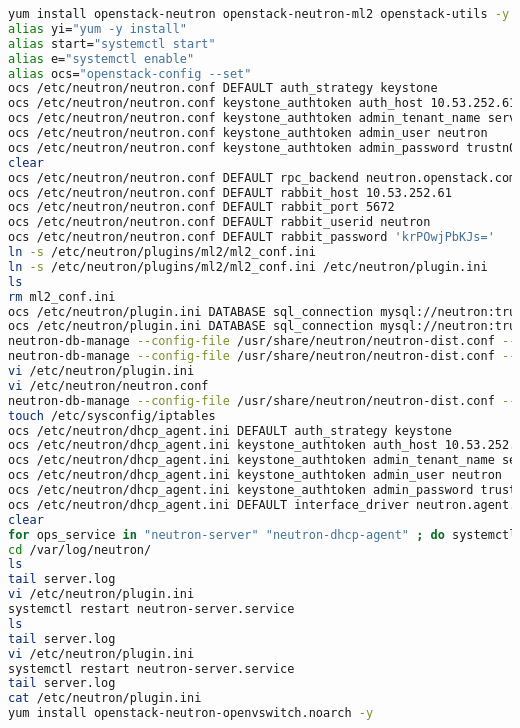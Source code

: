 \documentclass[11pt,letterpaper,oneside]{book}
\begin{document}
\begin{lstlisting}[caption={Neutron virneupaw001},language=bash]
yum install openstack-neutron openstack-neutron-ml2 openstack-utils -y
alias yi="yum -y install"
alias start="systemctl start"
alias e="systemctl enable"
alias ocs="openstack-config --set"
ocs /etc/neutron/neutron.conf DEFAULT auth_strategy keystone
ocs /etc/neutron/neutron.conf keystone_authtoken auth_host 10.53.252.61
ocs /etc/neutron/neutron.conf keystone_authtoken admin_tenant_name service
ocs /etc/neutron/neutron.conf keystone_authtoken admin_user neutron
ocs /etc/neutron/neutron.conf keystone_authtoken admin_password trustn01
clear
ocs /etc/neutron/neutron.conf DEFAULT rpc_backend neutron.openstack.common.rpc.impl_kombu
ocs /etc/neutron/neutron.conf DEFAULT rabbit_host 10.53.252.61
ocs /etc/neutron/neutron.conf DEFAULT rabbit_port 5672
ocs /etc/neutron/neutron.conf DEFAULT rabbit_userid neutron
ocs /etc/neutron/neutron.conf DEFAULT rabbit_password 'krPOwjPbKJs='
ln -s /etc/neutron/plugins/ml2/ml2_conf.ini
ln -s /etc/neutron/plugins/ml2/ml2_conf.ini /etc/neutron/plugin.ini
ls
rm ml2_conf.ini 
ocs /etc/neutron/plugin.ini DATABASE sql_connection mysql://neutron:trustn01@10.53.252.61/neutron
ocs /etc/neutron/plugin.ini DATABASE sql_connection mysql://neutron:trustn01@10.53.252.61/neutron_ml2
neutron-db-manage --config-file /usr/share/neutron/neutron-dist.conf --config-file /etc/neutron/neutron.conf --config /etc/neutron/plugin.ini upgrade head
neutron-db-manage --config-file /usr/share/neutron/neutron-dist.conf --config-file /etc/neutron/neutron.conf --config-file /etc/neutron/plugin.ini upgrade head
vi /etc/neutron/plugin.ini 
vi /etc/neutron/neutron.conf 
neutron-db-manage --config-file /usr/share/neutron/neutron-dist.conf --config-file /etc/neutron/neutron.conf --config-file /etc/neutron/plugin.ini upgrade head
touch /etc/sysconfig/iptables
ocs /etc/neutron/dhcp_agent.ini DEFAULT auth_strategy keystone
ocs /etc/neutron/dhcp_agent.ini keystone_authtoken auth_host 10.53.252.61
ocs /etc/neutron/dhcp_agent.ini keystone_authtoken admin_tenant_name service
ocs /etc/neutron/dhcp_agent.ini keystone_authtoken admin_user neutron
ocs /etc/neutron/dhcp_agent.ini keystone_authtoken admin_password trustn01
ocs /etc/neutron/dhcp_agent.ini DEFAULT interface_driver neutron.agent.linux.interface.OVSInterfaceDriver
clear
for ops_service in "neutron-server" "neutron-dhcp-agent" ; do systemctl enable $ops_service; systemctl start $ops_service; done
cd /var/log/neutron/
ls
tail server.log 
vi /etc/neutron/plugin.ini 
systemctl restart neutron-server.service 
ls
tail server.log 
vi /etc/neutron/plugin.ini 
systemctl restart neutron-server.service 
tail server.log 
cat /etc/neutron/plugin.ini 
yum install openstack-neutron-openvswitch.noarch -y
\end{lstlisting}
\end{document}
